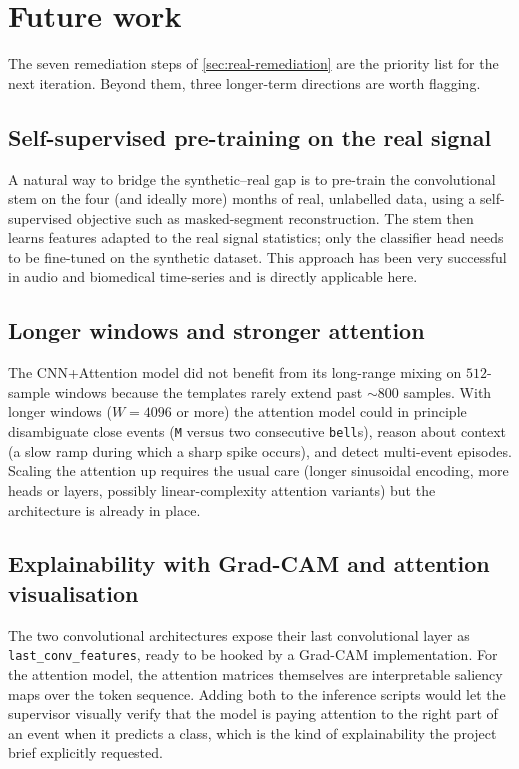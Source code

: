 \section{Future work}
\label{sec:conc-future}

The seven remediation steps of \cref{sec:real-remediation} are the
priority list for the next iteration. Beyond them, three longer-term
directions are worth flagging.

\subsection{Self-supervised pre-training on the real signal}

A natural way to bridge the synthetic--real gap is to pre-train the
convolutional stem on the four (and ideally more) months of real,
unlabelled data, using a self-supervised objective such as
masked-segment reconstruction. The stem then learns features adapted
to the real signal statistics; only the classifier head needs to be
fine-tuned on the synthetic dataset. This approach has been very
successful in audio and biomedical time-series and is directly
applicable here.

\subsection{Longer windows and stronger attention}
\label{sec:future-attention}

The CNN+Attention model did not benefit from its long-range mixing on
$512$-sample windows because the templates rarely extend past
$\sim 800$ samples. With longer windows ($W = 4096$ or more) the
attention model could in principle disambiguate close events
(\texttt{M} versus two consecutive \texttt{bell}s), reason about
context (a slow ramp during which a sharp spike occurs), and detect
multi-event episodes. Scaling the attention up requires the usual care
(longer sinusoidal encoding, more heads or layers, possibly
linear-complexity attention variants) but the architecture is already
in place.

\subsection{Explainability with Grad-CAM and attention visualisation}

The two convolutional architectures expose their last convolutional
layer as \texttt{last\_conv\_features}, ready to be hooked by a
Grad-CAM implementation. For the attention model, the attention
matrices themselves are interpretable saliency maps over the token
sequence. Adding both to the inference scripts would let the supervisor
visually verify that the model is paying attention to the right part
of an event when it predicts a class, which is the kind of
explainability the project brief explicitly requested.

